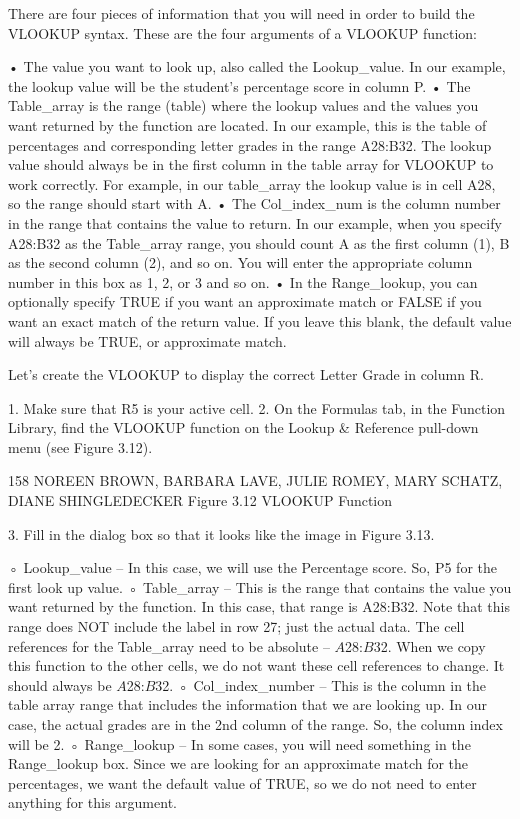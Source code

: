 There are four pieces of information that you will need in order to build the VLOOKUP syntax. These
are the four arguments of a VLOOKUP function:

• The value you want to look up, also called the Lookup_value. In our example, the lookup value
will be the student’s percentage score in column P.
• The Table_array is the range (table) where the lookup values and the values you want returned by
the function are located. In our example, this is the table of percentages and corresponding letter
grades in the range A28:B32. The lookup value should always be in the first column in the table
array for VLOOKUP to work correctly. For example, in our table_array the lookup value is in cell
A28, so the range should start with A.
• The Col_index_num is the column number in the range that contains the value to return. In our
example, when you specify A28:B32 as the Table_array range, you should count A as the first
column (1), B as the second column (2), and so on. You will enter the appropriate column number
in this box as 1, 2, or 3 and so on.
• In the Range_lookup, you can optionally specify TRUE if you want an approximate match or
FALSE if you want an exact match of the return value. If you leave this blank, the default value will
always be TRUE, or approximate match.

Let’s create the VLOOKUP to display the correct Letter Grade in column R.

1. Make sure that R5 is your active cell.
2. On the Formulas tab, in the Function Library, find the VLOOKUP function on the Lookup &
Reference pull-down menu (see Figure 3.12).




158 NOREEN BROWN, BARBARA LAVE, JULIE ROMEY, MARY SCHATZ, DIANE SHINGLEDECKER
Figure 3.12 VLOOKUP Function


3. Fill in the dialog box so that it looks like the image in Figure 3.13.

◦ Lookup_value – In this case, we will use the Percentage score. So, P5 for the first look up
value.
◦ Table_array – This is the range that contains the value you want returned by the function. In
this case, that range is A28:B32. Note that this range does NOT include the label in row 27;
just the actual data. The cell references for the Table_array need to be absolute –
$A$28:$B$32. When we copy this function to the other cells, we do not want these cell
references to change. It should always be $A$28:$B$32.
◦ Col_index_number – This is the column in the table array range that includes the
information that we are looking up. In our case, the actual grades are in the 2nd column of the
range. So, the column index will be 2.
◦ Range_lookup – In some cases, you will need something in the Range_lookup box. Since we
are looking for an approximate match for the percentages, we want the default value of TRUE,
so we do not need to enter anything for this argument.

